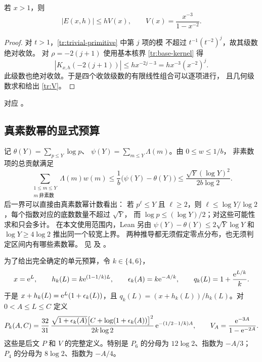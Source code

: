 \begin{lemma}[平凡零点的完整上界]\label{tr:trivial-bound}
若 $x>1$，则
\begin{equation}\label{tr:V}
 |E(x,h)|\leq h V(x),\qquad
 V(x)=\frac{x^{-3}}{1-x^{-2}}.
\end{equation}
\end{lemma}
\begin{proof}
对 $t>1$，\eqref{tr:trivial-primitive} 中第 $j$ 项的模
不超过 $t^{-1}(t^{-2})^j$，故其级数绝对收敛。
对 $\rho=-2(j+1)$ 使用基本核界 \eqref{tr:base-kernel} 得
\[
 |K_{x,h}(-2(j+1))|
 \leq h x^{-2j-3}=h x^{-3}(x^{-2})^j.
\]
此级数也绝对收敛。于是四个收敛级数的有限线性组合可以逐项进行，
且几何级数求和给出 \eqref{tr:V}。
\end{proof}
对应 。

\subsection{真素数幂的显式预算}

记 $\theta(Y)=\sum_{p\leq Y}\log p$、
$\psi(Y)=\sum_{m\leq Y}\Lambda(m)$。由 $0\leq w\leq1/b$，
非素数项的总贡献满足
\begin{equation}\label{tr:nonprime}
 \sum_{\substack{1\leq m\leq Y\\m\ \text{非素数}}}
       \Lambda(m)w(m)
 \leq\frac1b\bigl(\psi(Y)-\theta(Y)\bigr)
 \leq\frac{\sqrt Y(\log Y)^2}{2b\log2}.
\end{equation}
后一界可以直接由真素数幂计数看出：
若 $p^\ell\leq Y$ 且 $\ell\geq2$，则
$\ell\leq\log Y/\log2$，每个指数对应的底数数量不超过 $\sqrt Y$，
而 $\log p\leq(\log Y)/2$；对这些可能性求和只会多计。
在本文使用范围内，Lean 另由
$\psi(Y)-\theta(Y)\leq2\sqrt Y\log Y$ 和 $\log Y\geq4\log2$
推出同一个较宽上界。
两种推导都无须假定零点分布，也无须判定区间内有哪些素数幂。
见 
及 。

为了给出完全确定的单元预算，令 $k\in\{4,6\}$，
\begin{equation}\label{tr:domains}
 x=\mathrm e^L,\qquad h_k(L)=k\mathrm e^{(1-1/k)L},\qquad
 \epsilon_k(A)=k\mathrm e^{-A/k},\qquad
 q_k(L)=1+\frac{\mathrm e^{L/k}}{k}.
\end{equation}
于是 $x+h_k(L)=\mathrm e^L(1+\epsilon_k(L))$，且
$q_k(L)=(x+h_k(L))/h_k(L)$。对 $0<A\leq L\leq C$ 定义
\begin{equation}\label{tr:Pcell}
 P_k(A,C)=
 \frac{32}{31}\,
 \frac{\sqrt{1+\epsilon_k(A)}
       \bigl[C+\log(1+\epsilon_k(A))\bigr]^2}
      {2k\log2}\,
 \mathrm e^{-(1/2-1/k)A},
 \qquad
 V_A=\frac{\mathrm e^{-3A}}{1-\mathrm e^{-2A}}.
\end{equation}
这些是后文 $P$ 和 $V$ 的完整定义。特别是
$P_6$ 的分母为 $12\log2$、指数为 $-A/3$；
$P_4$ 的分母为 $8\log2$、指数为 $-A/4$。

